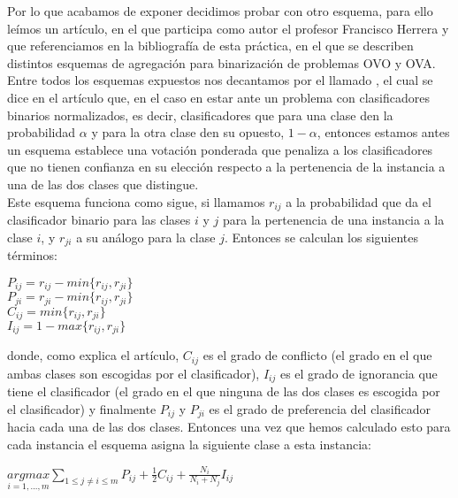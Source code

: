 Por lo que acabamos de exponer decidimos probar con otro esquema, para ello leímos un artículo, en el que participa como autor el profesor Francisco Herrera y que referenciamos en la bibliografía de esta práctica, en el que se describen distintos esquemas de agregación para binarización de problemas OVO y OVA. Entre todos los esquemas expuestos nos decantamos por el llamado , el cual se dice en el artículo que, en el caso en estar ante un problema con clasificadores binarios normalizados, es decir, clasificadores que para una clase den la probabilidad $\alpha$ y para la otra clase den su opuesto, $1 - \alpha$, entonces estamos antes un esquema establece una votación ponderada que penaliza a los clasificadores que no tienen confianza en su elección respecto a la pertenencia de la instancia a una de las dos clases que distingue.\\

Este esquema funciona como sigue, si llamamos $r_{ij}$ a la probabilidad que da el clasificador binario para las clases $i$ y $j$ para la pertenencia de una instancia a la clase $i$, y $r_{ji}$ a su análogo para la clase $j$. Entonces se calculan los siguientes términos:

\begin{center}
$P_{ij} = r_{ij} - min\lbrace r_{ij}, r_{ji} \rbrace$\\
$P_{ji} = r_{ji} - min \lbrace r_{ij}, r_{ji} \rbrace$\\
$C_{ij} = min\lbrace r_{ij}, r_{ji} \rbrace$\\
$I_{ij} = 1 - max\lbrace r_{ij}, r_{ji} \rbrace$
\end{center}

donde, como explica el artículo, $C_{ij}$ es el grado de conflicto (el grado en el que ambas clases son escogidas por el clasificador), $I_{ij}$ es el grado de ignorancia que tiene el clasificador (el grado en el que ninguna de las dos clases es escogida por el clasificador) y finalmente $P_{ij}$ y $P_{ji}$ es el grado de preferencia del clasificador hacia cada una de las dos clases. Entonces una vez que hemos calculado esto para cada instancia el esquema asigna la siguiente clase a esta instancia:

\begin{center}
$\underset{i = 1,...,m}{argmax} \underset{1 \leq j \neq i \leq m}{\sum} P_{ij} + \frac{1}{2} C_{ij} + \frac{N_i}{N_i + N_j}I_{ij}$
\end{center}

